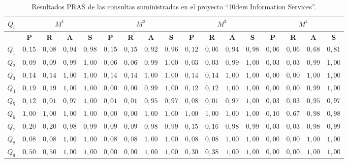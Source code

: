 \documentclass[a4paper,final,11pt,fleqn,twoside]{book}  %
\begin{document}
\begin{table}
  \centering
  \caption{Resultados PRAS de las consultas suministradas en el proyecto ``10ders Information Services''.}\label{table:queries-ir-results}
\begin{tabular}{|c||c|c|c|c||c|c|c|c||c|c|c|c||c|c|c|c|}
\hline
 \textbf{$Q_i$}&\multicolumn{4}{|c||}{$M^{1}$} & \multicolumn{4}{|c||}{$M^{2}$}& \multicolumn{4}{|c||}{$M^{3}$} & \multicolumn{4}{|c|}{$M^{4}$} \\ \hline
	  &\textbf{P} & \textbf{R} & \textbf{A} & \textbf{S} &		\textbf{P} & \textbf{R} & \textbf{A} & \textbf{S} &			\textbf{P} & \textbf{R} & \textbf{A} & \textbf{S} &		\textbf{P} & \textbf{R} & \textbf{A} & \textbf{S}  \\ \hline \hline
$Q_1$  	  &$0,15$ & $0,08$ & $0,94$ & $0,98$ &		$0,15$ & $0,15$ & $0,92$ & $0,96$ &	$0,12$ & $0,06$ & $0,94$ & $0,98$ &	$0,06$ & $0,06$ & $0,68$ & $0,81$ \\ \hline
$Q_2$  	  &$0,09$ & $0,09$ & $0,99$ & $1,00$ & 		$0,06$ & $0,06$ & $0,99$ & $1,00$ & 	$0,03$ & $0,03$ & $0,99$ & $1,00$ & 	$0,03$ & $0,03$ & $0,99$ & $1,00$ \\ \hline
$Q_3$  	  &$0,14$ & $0,14$ & $1,00$ & $1,00$ & 		$0,14$ & $0,14$ & $1,00$ & $1,00$ & 	$0,14$ & $0,14$ & $1,00$ & $1,00$ & 	$0,00$ & $0,00$ & $1,00$ & $1,00$ \\ \hline
$Q_4$  	  &$0,19$ & $0,19$ & $1,00$ & $1,00$ &		$0,00$ & $0,00$ & $0,99$ & $1,00$ & 	$0,12$ & $0,12$ & $1,00$ & $1,00$ & 	$0,00$ & $0,00$ & $0,99$ & $1,00$ \\ \hline
$Q_5$  	  &$0,12$ & $0,01$ & $0,97$ & $1,00$ & 		$0,01$ & $0,01$ & $0,95$ & $0,97$ & 	$0,08$ & $0,01$ & $0,97$ & $1,00$ & 	$0,03$ & $0,03$ & $0,95$ & $0,97$ \\ \hline
$Q_6$  	  &$1,00$ & $1,00$ & $1,00$ & $1,00$ & 		$0,00$ & $0,00$ & $1,00$ & $1,00$ & 	$1,00$ & $1,00$ & $1,00$ & $1,00$ & 	$0,10$ & $0,67$ & $0,98$ & $0,98$ \\ \hline
$Q_7$  	  &$0,20$ & $0,20$ & $0,98$ & $0,99$ & 		$0,09$ & $0,09$ & $0,98$ & $0,99$ & 	$0,15$ & $0,16$ & $0,98$ & $0,99$ & 	$0,03$ & $0,03$ & $0,98$ & $0,99$ \\ \hline
$Q_8$  	  &$0,08$ & $0,08$ & $1,00$ & $1,00$ & 		$0,08$ & $0,08$ & $1,00$ & $1,00$ & 	$0,08$ & $0,08$ & $1,00$ & $1,00$ & 	$0,00$ & $0,00$ & $1,00$ & $1,00$ \\ \hline
$Q_9$  	  &$0,50$ & $0,50$ & $1,00$ & $1,00$ & 		$0,00$ & $0,00$ & $1,00$ & $1,00$ & 	$0,30$ & $0,38$ & $1,00$ & $1,00$ & 	$0,00$ & $0,00$ & $1,00$ & $1,00$ \\ \hline

\end{tabular}
\end{table}
\end{document}

